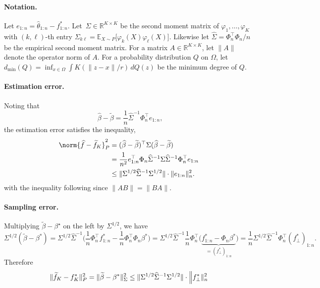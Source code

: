 \documentclass{article}
\newcommand{\Reals}{\mathbb{R}}
\newcommand{\1}{\mathbf{1}}
\newcommand{\Ebb}{\mathbb{E}}
\newcommand{\wt}[1]{\widetilde{#1}}
\newcommand{\wh}[1]{\widehat{#1}}
\theoremstyle{definition}
\theoremstyle{remark}
\begin{document}
\paragraph{Notation.} Let $e_{1:n} = \wh{\theta}_{1:n} - {f}^{\ast}_{1:n}$. Let~$\Sigma \in \Reals^{K \times K}$ be the second moment matrix of $\varphi_1,\ldots,\varphi_K$ with $(k,\ell)$-th entry $\Sigma_{k\ell} = \Ebb_{X \sim P}\bigl[\varphi_k(X) \varphi_{\ell}(X)\bigr]$. Likewise let $\wh{\Sigma} = \Phi_n^{\top} \Phi_n/n$ be the empirical second moment matrix. For a matrix $A \in \Reals^{K \times K}$, let $\|A\|$ denote the operator norm of $A$.  For a probability distribution $Q$ on $\Omega$, let $d_{\min}(Q) = \inf_{x \in \Omega} \int K(\|z - x\|/r) \,dQ(z)$ be the minimum degree of $Q$.

\paragraph{Estimation error.}
Noting that
\begin{equation*}
~~\wh{\beta} - \wt{\beta} = \frac{1}{n}\wh{\Sigma}^{-1} \Phi_n^{\top} e_{1:n},
\end{equation*}
the estimation error satisfies the inequality,
\begin{align*}
\norm{\wh{f} - \wt{f}_K}_P^2 & = (\wh{\beta} - \wt{\beta})^{\top} \Sigma (\wh{\beta} - \wt{\beta}) \\
& = \frac{1}{n^2} e_{1:n}^{\top} \Phi_n \wh{\Sigma}^{-1} \Sigma \wh{\Sigma}^{-1} \Phi_n^{\top} e_{1:n} \\
& \leq \|\Sigma^{1/2} \wh{\Sigma}^{-1} \Sigma^{1/2}\| \cdot \|e_{1:n}\|_n^2.
\end{align*}
with the inequality following since $\|AB\| = \|BA\|$. 

\paragraph{Sampling error.}
Multiplying $\wt{\beta} - \beta^{\star}$ on the left by $\Sigma^{1/2}$, we have
\begin{equation*}
\Sigma^{1/2}(\wt{\beta} - \beta^{\ast}) =  \Sigma^{1/2} \wh{\Sigma}^{-1} \bigl( \frac{1}{n} \Phi_n^{\top} f_{1:n}^{\ast} - \frac{1}{n} \Phi_n^{\top} \Phi_n \beta^{\ast} \bigr) = \Sigma^{1/2} \wh{\Sigma}^{-1} \frac{1}{n} \Phi_n^{\top}  \bigl(\underbrace{f_{1:n}^{\ast} - \Phi_n \beta^{\ast}}_{ = (f_{\perp}^{\ast})_{1:n}} \bigr) = \frac{1}{n}\Sigma^{1/2} \wh{\Sigma}^{-1} \Phi_n^{\top} (f_{\perp}^{\ast})_{1:n}.
\end{equation*}
Therefore
\begin{equation*}
\|\wt{f}_K - f_K^{\ast}\|_P^2  = \|\wt{\beta} - \beta^{\ast}\|_{\Sigma}^2 \leq \|\Sigma^{1/2} \wh{\Sigma}^{-1} \Sigma^{1/2}\| \cdot \Bigl\|f_{\perp}^{\ast}\|_n^2
\end{equation*}
\end{document}
